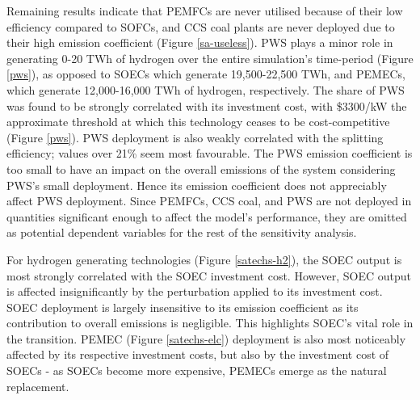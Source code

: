 Remaining results indicate that \gls{PEMFC}s are never utilised because of their low efficiency compared to \gls{SOFC}s, and \gls{CCS} coal plants are never deployed due to their high emission coefficient (Figure \ref{sa-useless}). \gls{PWS} plays a minor role in generating 0-20 TWh of hydrogen over the entire simulation's time-period (Figure \ref{pws}), as opposed to \gls{SOEC}s which generate 19,500-22,500 TWh, and \gls{PEMEC}s, which generate 12,000-16,000 TWh of hydrogen, respectively. The share of \gls{PWS} was found to be strongly correlated with its investment cost, with \$3300/kW the approximate threshold at which this technology ceases to be cost-competitive (Figure \ref{pws}). \gls{PWS} deployment is also weakly correlated with the splitting efficiency; values over 21\% seem most favourable. The \gls{PWS} emission coefficient is too small to have an impact on the overall emissions of the system considering \gls{PWS}'s small deployment. Hence its emission coefficient does not appreciably affect \gls{PWS} deployment. Since \gls{PEMFC}s, \gls{CCS} coal, and \gls{PWS} are not deployed in quantities significant enough to affect the model's performance, they are omitted as potential dependent variables for the rest of the sensitivity analysis.

For hydrogen generating technologies (Figure \ref{satechs-h2}), the \gls{SOEC} output is most strongly correlated with the SOEC investment cost. However, \gls{SOEC} output is affected insignificantly by the perturbation applied to its investment cost. \gls{SOEC} deployment is largely insensitive to its emission coefficient as its contribution to overall emissions is negligible. This highlights \gls{SOEC}'s vital role in the transition. \gls{PEMEC} (Figure \ref{satechs-elc}) deployment is also most noticeably affected by its respective investment costs, but also by the investment cost of SOECs - as SOECs become more expensive, \gls{PEMEC}s emerge as the natural replacement.